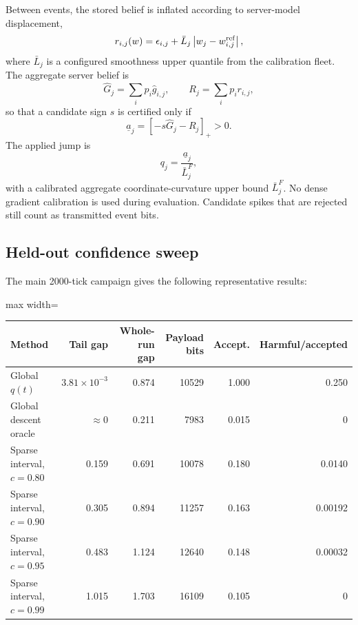 Between events, the stored belief is inflated according to server-model displacement,
\begin{equation}
  r_{i,j}(w)
  =\epsilon_{i,j}+\bar L_j\left|w_j-w_{i,j}^{\rm ref}\right|,
\end{equation}
where $\bar L_j$ is a configured smoothness upper quantile from the calibration fleet. The aggregate server belief is
\begin{equation}
  \hat G_j=\sum_i p_i\hat g_{i,j},
  \qquad
  R_j=\sum_i p_i r_{i,j},
\end{equation}
so that a candidate sign $s$ is certified only if
\begin{equation}
  \underline a_j=[-s\hat G_j-R_j]_+>0.
\end{equation}
The applied jump is
\begin{equation}
  q_j=\frac{\underline a_j}{\bar L_j^F},
\end{equation}
with a calibrated aggregate coordinate-curvature upper bound $\bar L_j^F$. No dense gradient calibration is used during evaluation. Candidate spikes that are rejected still count as transmitted event bits.

\subsection{Held-out confidence sweep}

The main 2000-tick campaign gives the following representative results:
\begin{center}
\begin{adjustbox}{max width=\textwidth}
\begin{tabular}{lrrrrr}
\toprule
Method & Tail gap & Whole-run gap & Payload bits & Accept. & Harmful/accepted \\
\midrule
Global $q(t)$ & $3.81\times10^{-3}$ & 0.874 & 10529 & 1.000 & 0.250 \\
Global descent oracle & $\approx0$ & 0.211 & 7983 & 0.015 & 0 \\
Sparse interval, $c=0.80$ & 0.159 & 0.691 & 10078 & 0.180 & 0.0140 \\
Sparse interval, $c=0.90$ & 0.305 & 0.894 & 11257 & 0.163 & 0.00192 \\
Sparse interval, $c=0.95$ & 0.483 & 1.124 & 12640 & 0.148 & 0.00032 \\
Sparse interval, $c=0.99$ & 1.015 & 1.703 & 16109 & 0.105 & 0 \\
\bottomrule
\end{tabular}
\end{adjustbox}
\end{center}

